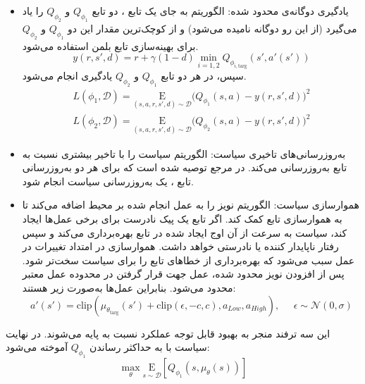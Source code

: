 \begin{itemize}
	\item یادگیری دوگانه‌ی محدود شده:
	 الگوریتم 
	  به جای یک تابع ، دو تابع
	   \(Q_{\phi_1}\) و \(Q_{\phi_2}\)
	    را یاد می‌گیرد (از این رو دوگانه نامیده می‌شود) و از کوچک‌ترین مقدار این دو 
	     \(Q_{\phi_1}\) و \(Q_{\phi_2}\)
	      برای بهینه‌سازی تابع بلمن استفاده می‌شود.
	      \begin{equation}
	      	y(r,s',d) = r + \gamma (1 - d) \min_{i=1,2} Q_{\phi_{i, \text{targ}}}(s', a'(s'))
	      \end{equation}
	      سپس، در هر دو تابع \(Q_{\phi_1}\) و \(Q_{\phi_2}\) یادگیری انجام می‌شود.
	      \begin{align}
	       L(\phi_1, {\mathcal D}) = 
	       	\underset{(s,a,r,s',d) \sim {\mathcal D}}{{\mathrm E}}
	       	{
	       	\Bigg( Q_{\phi_1}(s,a) - y(r,s',d) \Bigg)^2
	       }\\
	       L(\phi_2, {\mathcal D}) = \underset{(s,a,r,s',d) \sim {\mathcal D}}{{\mathrm E}}
	       	 {
	       	\Bigg( Q_{\phi_2}(s,a) - y(r,s',d) \Bigg)^2
	       }
	      \end{align}
	  \item به‌روزرسانی‌های تاخیری سیاست:
	   الگوریتم
	  سیاست را با تاخیر بیشتری نسبت به تابع  به‌روزرسانی می‌کند. در مرجع
	  \cite{TD3}
	   توصیه شده است که برای هر دو به‌روزرسانی تابع ، یک به‌روزرسانی سیاست انجام شود.
	   \item هموار‌سازی سیاست:
	    الگوریتم
	     نویز را به عمل انجام شده بر محیط اضافه می‌کند تا به هموارسازی تابع  کمک کند.
	     اگر تابع  یک پیک نادرست برای برخی عمل‌ها ایجاد کند، سیاست به سرعت از آن اوج ایجاد شده در تابع  بهره‌برداری می‌کند و سپس رفتار ناپایدار کننده یا نادرستی خواهد داشت.
	      هموارسازی  در امتداد تغییرات در عمل سبب می‌شود که بهره‌برداری از خطاهای تابع  را برای سیاست سخت‌تر شود. پس از افزودن نویز محدود شده، عمل جهت قرار گرفتن در محدوده عمل معتبر محدود می‌شود. بنابراین عمل‌ها به‌صورت زیر هستند:
	     \begin{equation}
	     	a'(s') = \text{clip}\left(\mu_{\theta_{\text{targ}}}(s') + \text{clip}(\epsilon,-c,c), a_{Low}, a_{High}\right), \;\;\;\;\; \epsilon \sim \mathcal{N}(0, \sigma)
	     \end{equation}
\end{itemize}
این سه ترفند منجر به بهبود قابل توجه عملکرد
 نسبت به  پایه می‌شوند.
 در نهایت سیاست با به حداکثر رساندن \(Q_{\phi_1} \) آموخته می‌شود:
 \begin{equation}
	 \max_{\theta} \underset{s \sim {\mathcal D}}{{\mathrm E}}\left[ Q_{\phi_1}(s, \mu_{\theta}(s)) \right]
 \end{equation}
 
